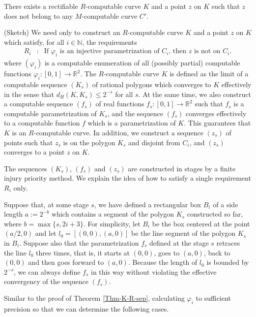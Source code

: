 \documentclass{LMCS}
\theoremstyle{plain}
\def\IN{\mathbb{N}}
\def\IR{\mathbb{R}}
\begin{document}
\begin{thm}\label{thm-R-M-sep}
There exists a rectifiable $R$-computable curve $K$ and a point $z$ on $K$ such that $z$ does not belong to any $M$-computable curve $C'$.
\end{thm}

\proof (Sketch) We need only to construct an $R$-computable curve $K$ and a point $z$ on $K$ which satisfy, for all $i\in\IN$, the requirements
\begin{eqnarray*}
  R_i &:& \mbox{If $\varphi_i$ is an injective parametrization of $C_i$, then $z$ is not on $C_i$.}
\end{eqnarray*}
where $(\varphi_i)$ is a computable enumeration of all (possibly partial) computable functions $\varphi_i: [0,1] \to \IR^2$. The $R$-computable curve $K$ is defined as the limit of a computable sequence $(K_s)$ of rational polygons which converges to $K$ effectively in the sense that $d_H(K, K_s) \le 2^{-s}$ for all $s$. At the same time, we also construct a computable sequence $(f_s)$ of real functions $f_s:[0,1]\to \IR^2$ such that $f_s$ is a computable parametrization of $K_s$, and the sequence $(f_s)$ converges effectively to a computable function $f$ which is a parametrization of $K$. This guarantees that $K$ is an $R$-computable curve. In addition, we construct a sequence $(z_s)$ of points such that $z_s$ is on the polygon $K_s$ and disjoint from $C_i$, and $(z_s)$ converges to a point $z$ on $K$.

The sequences $(K_s)$, $(f_s)$ and $(z_s)$ are constructed in stages by a finite injury priority method. We explain the idea of how to satisfy a single requirement $R_i$ only.

Suppose that, at some stage $s$, we have defined a rectangular box $B_i$ of a side length $a:=2^{-b}$ which contains a segment of the polygon $K_s$ constructed so far, where $b = \max\{s, 2i+3\} $. For simplicity, let $B_i$ be the box centered at the point $(a/2, 0)$ and let $l_0= [(0,0),(a, 0)]$ be the line segment of the polygon $K_s$ in $B_i$. Suppose also that the parametrization $f_s$ defined at the stage $s$ retraces the line $l_0$ three times, that is, it starts at $(0,0)$, goes to $(a, 0)$, back to $(0,0)$ and then goes forward to $(a, 0)$. Because the length of $l_0$ is bounded by $2^{-s}$, we can always define $f_s$ in this way without violating the effective convergency of the sequence $(f_s)$.

Similar to the proof of Theorem \ref{Thm-K-R-sep}, calculating $\varphi_i$ to sufficient precision so that we can determine the following cases.
\end{document}
